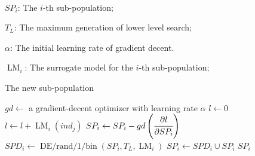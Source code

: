 \begin{algorithmic}[1]
    \REQUIRE~\\
    
    $SP_i$: The $i$-th sub-population;
    
    $T_L$: The maximum generation of lower level search;
    
    $\alpha$: The initial learning rate of gradient decent.
    
    $\operatorname{LM}_i$: The surrogate model for the $i$-th sub-population;
    
    \ENSURE The new sub-population

    \STATE $gd \leftarrow$ a gradient-decent optimizer with learning rate $\alpha$
        \STATE $l \leftarrow 0$
            \STATE $l \leftarrow l + \operatorname{LM}_i(ind_j)$
        \ENDFOR
        \STATE $SP_i \leftarrow SP_i - gd\left(\cfrac{\partial l}{\partial SP_i}\right)$
    \ENDFOR
    \STATE $SPD_i \leftarrow \operatorname{DE/rand/1/bin}(SP_i, T_L, \operatorname{LM}_i)$
    \STATE $SP_i \leftarrow SPD_i \cup SP_i$
    \RETURN $SP_i$
\end{algorithmic}